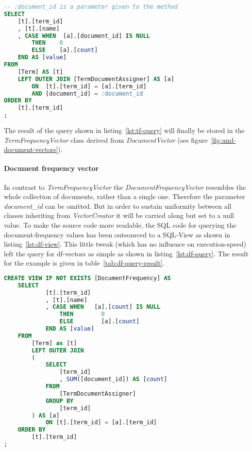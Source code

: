 \begin{lstlisting}[language=SQL,caption={SQL query for generating tf-vectors},label={lst:tf-query},float=h]
-- :document_id is a parameter given to the method
SELECT
    [t].[term_id]
    , [t].[name]
    , CASE WHEN  [a].[document_id] IS NULL
        THEN    0
        ELSE    [a].[count]
    END AS [value]
FROM
    [Term] AS [t]
    LEFT OUTER JOIN [TermDocumentAssigner] AS [a]
        ON  [t].[term_id] = [a].[term_id]
        AND [document_id] = :document_id
ORDER BY
    [t].[term_id]
;
\end{lstlisting}

The result of the query shown in listing~\ref{lst:tf-query} will finally be stored in the \textit{TermFrequencyVector} class derived from \textit{DocumentVector} (see figure~\ref{fig:uml-document-vectors}).

\FloatBarrier

\paragraph{Document frequency vector}
In contrast to \textit{TermFrequencyVector} the \textit{DocumentFrequencyVector} resembles the whole collection of documents, rather than a single one.
Therefore the parameter \textit{document\_id} can be omitted.
But in order to sustain uniformity between all classes inheriting from \textit{VectorCreator} it will be carried along but set to a null value.
To make the source code more readable, the SQL code for querying the document-frequency values has been outsourced to a SQL-View as shown in listing~\ref{lst:df-view}.
This little tweak (which has no influence on execution-speed) left the query for df-vectors as simple as shown in listing~\ref{lst:df-query}.
The result for the example is given in table~\ref{tab:df-query-result}.

\begin{lstlisting}[language=SQL,caption={SQL statement to create the \textit{DocumentFrequency}-view},label={lst:df-view},float=h]
CREATE VIEW IF NOT EXISTS [DocumentFrequency] AS
    SELECT
            [t].[term_id]
            , [t].[name]
            , CASE WHEN   [a].[count] IS NULL
                THEN        0
                ELSE        [a].[count]
            END AS [value]
    FROM
        [Term] as [t]
        LEFT OUTER JOIN
        (
            SELECT
                [term_id]
                , SUM([document_id]) AS [count]
            FROM
                [TermDocumentAssigner]
            GROUP BY
                [term_id]
        ) AS [a]
            ON [t].[term_id] = [a].[term_id]
    ORDER BY
        [t].[term_id]
;
\end{lstlisting}

